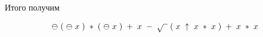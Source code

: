 \documentclass[a4paper, 14pt]{extarticle}
\begin{document}
\begin{figure}[h]
    \centering
\end{figure}

Итого получим

\begin{equation*}
    \ominus \hspace{3pt} ( \hspace{3pt} \ominus \hspace{3pt} x \hspace{3pt} ) \hspace{3pt} * \hspace{3pt} ( \hspace{3pt} \ominus \hspace{3pt} x \hspace{3pt} ) \hspace{3pt} + \hspace{3pt} x \hspace{3pt} - \hspace{3pt} \sqrt{\hphantom{1}} \hspace{3pt} ( \hspace{3pt} x \hspace{3pt} \uparrow \hspace{3pt} x \hspace{3pt} * \hspace{3pt} x \hspace{3pt} ) \hspace{3pt} + \hspace{3pt} x \hspace{3pt} * \hspace{3pt} x
\end{equation*}
\end{document}
